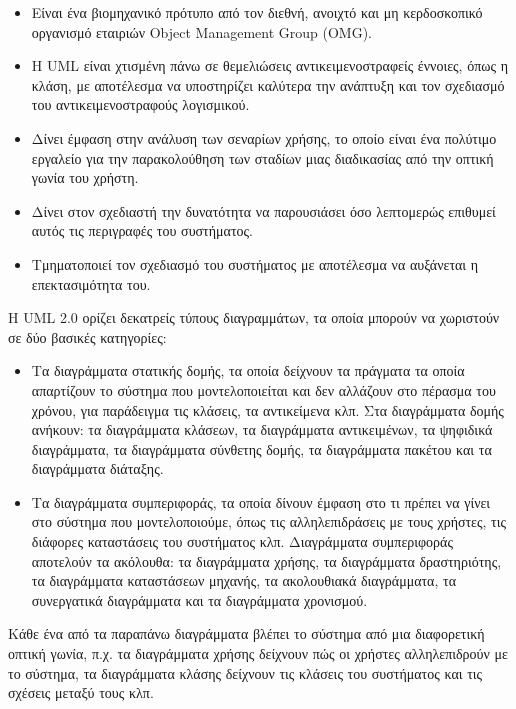 	 \begin{itemize}
	 \item Είναι ένα βιομηχανικό πρότυπο από τον διεθνή, ανοιχτό και μη κερδοσκοπικό οργανισμό εταιριών Object Management Group (OMG).
	 \item Η UML είναι χτισμένη πάνω σε θεμελιώσεις αντικειμενοστραφείς έννοιες, όπως η κλάση, με αποτέλεσμα να υποστηρίζει καλύτερα την ανάπτυξη και τον σχεδιασμό του αντικειμενοστραφούς λογισμικού.
	 \item Δίνει έμφαση στην ανάλυση των σεναρίων χρήσης, το οποίο είναι ένα πολύτιμο εργαλείο για την παρακολούθηση των σταδίων μιας διαδικασίας από την οπτική γωνία του χρήστη.
	 \item Δίνει στον σχεδιαστή την δυνατότητα να παρουσιάσει όσο λεπτομερώς επιθυμεί αυτός τις περιγραφές του συστήματος.
	 \item Τμηματοποιεί τον σχεδιασμό του συστήματος με αποτέλεσμα να αυξάνεται η επεκτασιμότητα του.
\end{itemize}	 

	Η UML 2.0 ορίζει δεκατρείς τύπους διαγραμμάτων, τα οποία μπορούν να χωριστούν σε δύο βασικές κατηγορίες:
	
	\begin{itemize}
		\item Τα διαγράμματα στατικής δομής, τα οποία δείχνουν τα πράγματα τα οποία απαρτίζουν το σύστημα που μοντελοποιείται και δεν αλλάζουν στο πέρασμα του χρόνου, για παράδειγμα τις κλάσεις, τα αντικείμενα κλπ. Στα διαγράμματα δομής ανήκουν: τα διαγράμματα κλάσεων, τα διαγράμματα αντικειμένων, τα ψηφιδικά διαγράμματα, τα διαγράμματα σύνθετης δομής, τα διαγράμματα πακέτου και τα διαγράμματα διάταξης.
		
		\item Τα διαγράμματα συμπεριφοράς, τα οποία δίνουν έμφαση στο τι πρέπει να γίνει στο σύστημα που μοντελοποιούμε, όπως τις αλληλεπιδράσεις με τους χρήστες, τις διάφορες καταστάσεις του συστήματος κλπ. Διαγράμματα συμπεριφοράς αποτελούν τα ακόλουθα: τα διαγράμματα χρήσης, τα διαγράμματα δραστηριότης, τα διαγράμματα καταστάσεων μηχανής, τα ακολουθιακά διαγράμματα, τα συνεργατικά διαγράμματα και τα διαγράμματα χρονισμού.
	\end{itemize}
	
Κάθε ένα από τα παραπάνω διαγράμματα βλέπει το σύστημα από μια διαφορετική οπτική γωνία, π.χ. τα διαγράμματα χρήσης δείχνουν πώς οι χρήστες αλληλεπιδρούν με το σύστημα, τα διαγράμματα κλάσης δείχνουν τις κλάσεις του συστήματος και τις σχέσεις μεταξύ τους κλπ.
	
